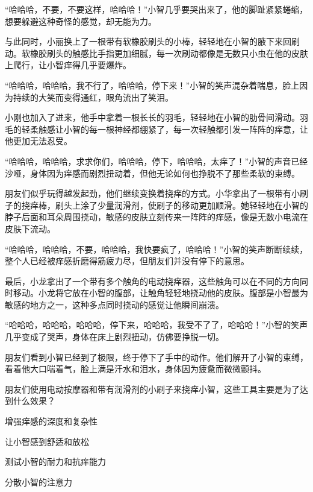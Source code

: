 \documentclass{exam-zh}
\begin{document}
\begin{material}[author = 杨宇, title = { 小智的故事 }]
“哈哈哈，不要，不要这样，哈哈哈！”小智几乎要哭出来了，他的脚趾紧紧蜷缩，想要躲避这种奇怪的感觉，却无能为力。

与此同时，小丽换上了一根带有软橡胶刷头的小棒，轻轻地在小智的腋下来回刷动。软橡胶刷头的触感比手指更加细腻，每一次刷动都像是无数只小虫在他的皮肤上爬行，让小智痒得几乎要爆炸。

“哈哈哈，哈哈哈，我不行了，哈哈哈，停下来！”小智的笑声混杂着喘息，脸上因为持续的大笑而变得通红，眼角流出了笑泪。

小刚也加入了进来，他手中拿着一根长长的羽毛，轻轻地在小智的肋骨间滑动。羽毛的轻柔触感让小智的每一根神经都绷紧了，每一次轻触都引发一阵阵的痒意，让他更加无法忍受。

“哈哈哈，哈哈哈，求求你们，哈哈哈，停下，哈哈哈，太痒了！”小智的声音已经沙哑，身体因为痒感而剧烈扭动着，但他无论如何也挣脱不了那些柔软的束缚。

朋友们似乎玩得越发起劲，他们继续变换着挠痒的方式。小华拿出了一根带有小刷子的挠痒棒，刷头上涂了少量润滑剂，使刷子的移动更加顺滑。她轻轻地在小智的脖子后面和耳朵周围挠动，敏感的皮肤立刻传来一阵阵的痒感，像是无数小电流在皮肤下流动。

“哈哈哈，哈哈哈，不要，哈哈哈，我快要疯了，哈哈哈！”小智的笑声断断续续，整个人已经被痒感折磨得筋疲力尽，但朋友们并没有停下的意思。

最后，小龙拿出了一个带有多个触角的电动挠痒器，这些触角可以在不同的方向同时移动。小龙将它放在小智的腹部，让触角轻轻地挠动他的皮肤。腹部是小智最为敏感的地方之一，这种多点同时挠动的感觉让他瞬间崩溃。

“哈哈哈，哈哈哈，哈哈哈，停下来，哈哈哈，我受不了了，哈哈哈！”小智的笑声几乎变成了哭声，身体在床上剧烈扭动，仿佛要挣脱一切。

朋友们看到小智已经到了极限，终于停下了手中的动作。他们解开了小智的束缚，看着他大口喘着气，脸上满是汗水和泪水，身体因为疲惫而微微颤抖。




\end{material}


\begin{question}[points = 2]
  朋友们使用电动按摩器和带有润滑剂的小刷子来挠痒小智，这些工具主要是为了达到什么效果？
  \begin{choices}
    \item 增强痒感的深度和复杂性
    \item 让小智感到舒适和放松
    \item 测试小智的耐力和抗痒能力
    \item 分散小智的注意力
  \end{choices}
\end{question}
\end{document}
